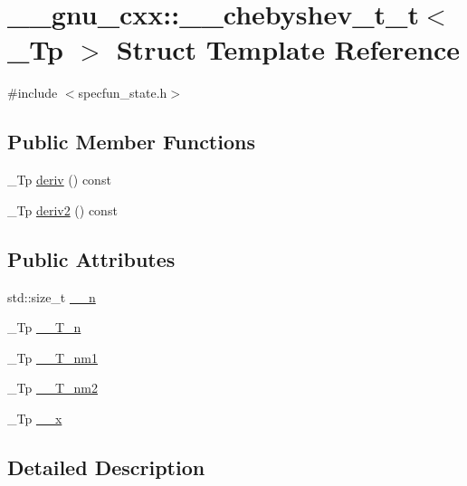 \hypertarget{struct____gnu__cxx_1_1____chebyshev__t__t}{}\section{\+\_\+\+\_\+gnu\+\_\+cxx\+:\+:\+\_\+\+\_\+chebyshev\+\_\+t\+\_\+t$<$ \+\_\+\+Tp $>$ Struct Template Reference}
\label{struct____gnu__cxx_1_1____chebyshev__t__t}


{\ttfamily \#include $<$specfun\+\_\+state.\+h$>$}

\subsection*{Public Member Functions}
\begin{DoxyCompactItemize}
\item 
\+\_\+\+Tp \hyperlink{struct____gnu__cxx_1_1____chebyshev__t__t_a56cbd3597ee48e612b596c9982d23e79}{deriv} () const
\item 
\+\_\+\+Tp \hyperlink{struct____gnu__cxx_1_1____chebyshev__t__t_a7b8086b8c304f7cca7cd971c7be8c2c5}{deriv2} () const
\end{DoxyCompactItemize}
\subsection*{Public Attributes}
\begin{DoxyCompactItemize}
\item 
std\+::size\+\_\+t \hyperlink{struct____gnu__cxx_1_1____chebyshev__t__t_a47d376b97626d77b99986c4c81ad365b}{\+\_\+\+\_\+n}
\item 
\+\_\+\+Tp \hyperlink{struct____gnu__cxx_1_1____chebyshev__t__t_adf551a5a058f9f5ab962e1d4b9e22f12}{\+\_\+\+\_\+\+T\+\_\+n}
\item 
\+\_\+\+Tp \hyperlink{struct____gnu__cxx_1_1____chebyshev__t__t_a5bd9de811f5d2decba40b560092d39f3}{\+\_\+\+\_\+\+T\+\_\+nm1}
\item 
\+\_\+\+Tp \hyperlink{struct____gnu__cxx_1_1____chebyshev__t__t_a3528c96b44c3734eed8570189644c0a1}{\+\_\+\+\_\+\+T\+\_\+nm2}
\item 
\+\_\+\+Tp \hyperlink{struct____gnu__cxx_1_1____chebyshev__t__t_adc03ac0a37e1d895bd74330772146eb7}{\+\_\+\+\_\+x}
\end{DoxyCompactItemize}


\subsection{Detailed Description}
